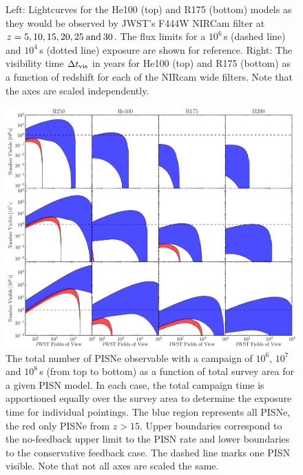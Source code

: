 \documentclass{thesis}
\begin{document}
\begin{appendix}
\begin{figure}[p]
\begin{center}
{\begin{picture}
              \end{picture}}
              \caption{\footnotesize Left: Lightcurves for the
                \citet{KasenWoosleyHeger2011} He100 (top) and R175
                (bottom) models as they would be observed by JWST's
                F444W NIRCam filter at $z = 5, 10, 15, 20, 25 \:{\rm
                  and}\: 30$. The flux limits for a $10^6\,$s (dashed
                line) and $10^4\,$s (dotted line) exposure are shown
                for reference.  Right: The visibility time $\Delta
                t_{\rm vis}$ in years for He100 (top) and R175
                (bottom) as a function of redshift for each of the
                NIRcam wide filters. Note that the axes are scaled
                independently.}
              \label{visibility2}
  \end{center}
  \vspace*{\fill}
\end{figure}

\begin{figure}[p]
  \vspace*{\fill}
  \begin{center}
    \includegraphics[width=\textwidth]{area_observability}
    \caption{\footnotesize The total number of PISNe observable with a
      campaign of $10^6$, $10^7$ and $10^8\,$s (from top to bottom) as
      a function of total survey area for a given PISN model.  In each
      case, the total campaign time is apportioned equally over the
      survey area to determine the exposure time for individual
      pointings.  The blue region represents all PISNe, the red only
      PISNe from $z>15$.  Upper boundaries correspond to the
      no-feedback upper limit to the PISN rate and lower boundaries to
      the conservative feedback case.  The dashed line marks one PISN
      visible. Note that not all axes are scaled the same.  }
    \label{area_obs}
  \end{center}
  \vspace*{\fill}
\end{figure} 
\end{appendix}
\end{document}
